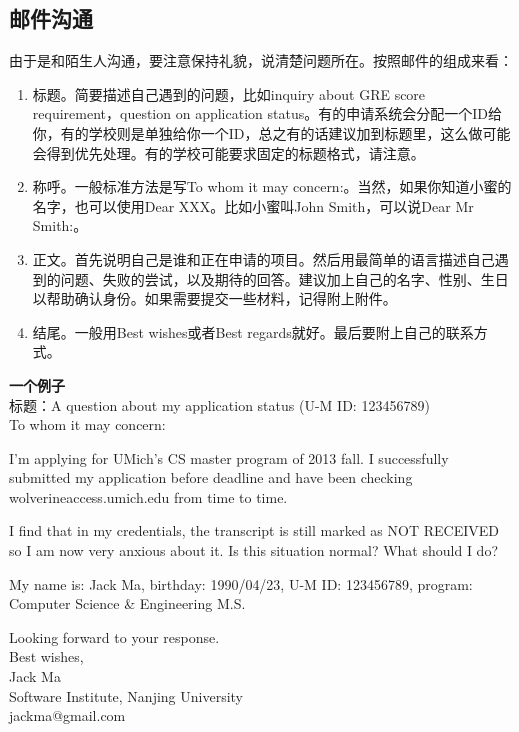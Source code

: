 \subsection{邮件沟通}
由于是和陌生人沟通，要注意保持礼貌，说清楚问题所在。按照邮件的组成来看：
\begin{enumerate}
\item 标题。简要描述自己遇到的问题，比如inquiry about GRE score requirement，question on application status。有的申请系统会分配一个ID给你，有的学校则是单独给你一个ID，总之有的话建议加到标题里，这么做可能会得到优先处理。有的学校可能要求固定的标题格式，请注意。
\item 称呼。一般标准方法是写To whom it may concern:。当然，如果你知道小蜜的名字，也可以使用Dear XXX。比如小蜜叫John Smith，可以说Dear Mr Smith:。
\item 正文。首先说明自己是谁和正在申请的项目。然后用最简单的语言描述自己遇到的问题、失败的尝试，以及期待的回答。建议加上自己的名字、性别、生日以帮助确认身份。如果需要提交一些材料，记得附上附件。
\item 结尾。一般用Best wishes或者Best regards就好。最后要附上自己的联系方式。
\end{enumerate}
\textbf{一个例子}\\
标题：A question about my application status (U-M ID: 123456789)\\
To whom it may concern:\par
I'm applying for UMich's CS master program of 2013 fall. I successfully submitted my application before deadline and have been checking wolverineaccess.umich.edu from time to time.\par

I find that in my credentials, the transcript is still marked as NOT RECEIVED so I am now very anxious about it. Is this situation normal? What should I do?\par

My name is: Jack Ma, birthday: 1990/04/23, U-M ID: 123456789, program: Computer Science \& Engineering M.S.\par

Looking forward to your response.\\

\hspace{-3ex}Best wishes,\\
Jack Ma\\
Software Institute, Nanjing University\\
jackma@gmail.com\par

